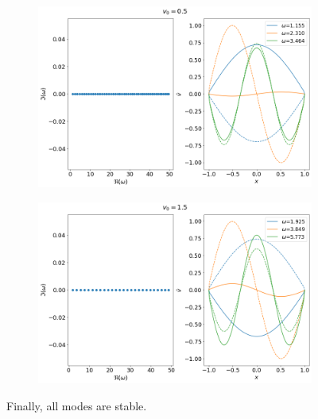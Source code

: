 \documentclass{article}
\begin{document}
\begin{figure}[H]
    \centering
    \begin{subfigure}[b]{0.45\linewidth}
        \includegraphics[width=\linewidth]{img/results-normal-v0=0.5.png}
        \caption{}
    \end{subfigure}%
    \begin{subfigure}[b]{0.45\linewidth}
        \includegraphics[width=\linewidth]{img/results-normal-v0=1.5.png}
        \caption{}
    \end{subfigure}
    \caption{Finally, all modes are stable.}
    \label{fig:results-normal}
\end{figure}
\end{document}
